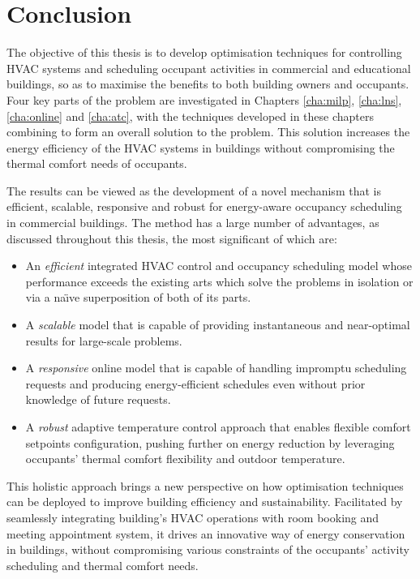 \chapter{Conclusion}
\label{cha:conc}

The objective of this thesis is to develop optimisation techniques for controlling HVAC systems and scheduling occupant activities in commercial and educational buildings, so as to maximise the benefits to both building owners and occupants.
Four key parts of the problem are investigated in Chapters \ref{cha:milp}, \ref{cha:lns}, \ref{cha:online} and \ref{cha:atc}, with the techniques developed in these chapters combining to form an overall solution to the problem. This solution increases the energy efficiency of the HVAC systems in buildings without compromising the thermal comfort needs of occupants. %

The results can be viewed as the development of a novel mechanism that is efficient, scalable, responsive and robust for energy-aware occupancy scheduling in commercial buildings. The method has a large number of advantages, as discussed throughout this thesis, the most significant of which are:

\begin{itemize}
	\item An \textsl{efficient} integrated HVAC control and occupancy scheduling model whose performance exceeds the existing arts which solve the problems in isolation or via a na\"{\i}ve superposition of both of its parts.
	\item A \textsl{scalable} model that is capable of providing instantaneous and near-optimal results for large-scale problems.
	\item A \textsl{responsive} online model that is capable of handling impromptu scheduling requests and producing energy-efficient schedules even without prior knowledge of future requests.
	\item A \textsl{robust} adaptive temperature control approach that enables flexible comfort setpoints configuration, pushing further on energy reduction by leveraging occupants' thermal comfort flexibility and outdoor temperature.
\end{itemize}

This holistic approach brings a new perspective on how optimisation techniques can be deployed to improve building efficiency and sustainability. Facilitated by seamlessly integrating building's HVAC operations with room booking and meeting appointment system, it drives an innovative way of energy conservation in buildings, without compromising various constraints of the occupants' activity scheduling and thermal comfort needs.

